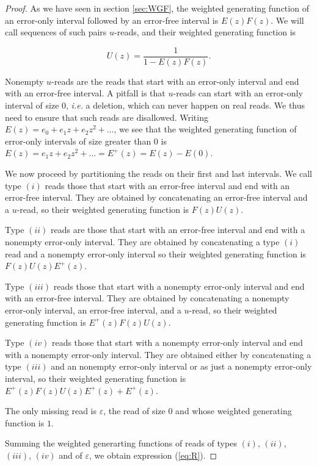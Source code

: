 \documentclass{article}
\begin{document}
\begin{proof}
As we have seen in section \ref{sec:WGF}, the weighted generating function
of an error-only interval followed by an error-free interval is
$E(z)F(z)$. We will call sequences of such pairs $u$-reads, and
their weighted generating function is

\begin{equation*}
U(z) = \frac{1}{1-E(z)F(z)}.
\end{equation*}

Nonempty $u$-reads are the reads that start with an error-only interval
and end with an error-free interval. A pitfall is that $u$-reads can start
with an error-only interval of size $0$, \textit{i.e.} a deletion, which
can never happen on real reads. We thus need to ensure that such reads are
disallowed. Writing $E(z) = e_0 + e_1z + e_2z^2 + \ldots$, we see that the
weighted generating function of error-only intervals of size greater than
$0$ is $E(z) = e_1z + e_2z^2 + \ldots = E^+(z) = E(z) - E(0)$. 

We now proceed by partitioning the reads on their first and last intervals.
We call type $(i)$ reads those that start with an error-free interval and
end with an error-free interval. They are obtained by concatenating an
error-free interval and a $u$-read, so their weighted generating function
is $F(z)U(z)$.

Type $(ii)$ reads are those that start with an error-free interval and end
with a nonempty error-only interval. They are obtained by concatenating a
type $(i)$ read and a nonempty error-only interval so their weighted
generating function is $F(z)U(z)E^+(z)$.

Type $(iii)$ reads those that start with a nonempty error-only interval
and end with an error-free interval. They are obtained by concatenating a
nonempty error-only interval, an error-free interval, and a $u$-read, so
their weighted generating function is $E^+(z)F(z)U(z)$.

Type $(iv)$ reads those that start with a nonempty error-only interval and
end with a nonempty error-only interval. They are obtained either by
concatenating a type $(iii)$ and an nonempty error-only interval or as
just a nonempty error-only interval, so their weighted generating function
is $E^+(z)F(z)U(z)E^+(z) + E^+(z)$.

The only missing read is $\varepsilon$, the read of size $0$ and whose
weighted generating function is $1$.

Summing the weighted generarting functions of reads of types $(i)$,
$(ii)$, $(iii)$, $(iv)$ and of $\varepsilon$, we obtain expression
(\ref{eq:R}).
\end{proof}
\end{document}
